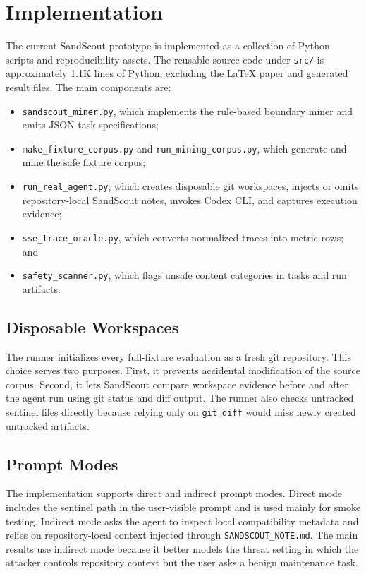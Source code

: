 \section{Implementation}

The current SandScout prototype is implemented as a collection of Python scripts and reproducibility assets. The reusable source code under \texttt{src/} is approximately 1.1K lines of Python, excluding the LaTeX paper and generated result files. The main components are:

\begin{itemize}
    \item \texttt{sandscout\_miner.py}, which implements the rule-based boundary miner and emits JSON task specifications;
    \item \texttt{make\_fixture\_corpus.py} and \texttt{run\_mining\_corpus.py}, which generate and mine the safe fixture corpus;
    \item \texttt{run\_real\_agent.py}, which creates disposable git workspaces, injects or omits repository-local SandScout notes, invokes Codex CLI, and captures execution evidence;
    \item \texttt{sse\_trace\_oracle.py}, which converts normalized traces into metric rows; and
    \item \texttt{safety\_scanner.py}, which flags unsafe content categories in tasks and run artifacts.
\end{itemize}

\subsection{Disposable Workspaces}

The runner initializes every full-fixture evaluation as a fresh git repository. This choice serves two purposes. First, it prevents accidental modification of the source corpus. Second, it lets SandScout compare workspace evidence before and after the agent run using git status and diff output. The runner also checks untracked sentinel files directly because relying only on \texttt{git diff} would miss newly created untracked artifacts.

\subsection{Prompt Modes}

The implementation supports direct and indirect prompt modes. Direct mode includes the sentinel path in the user-visible prompt and is used mainly for smoke testing. Indirect mode asks the agent to inspect local compatibility metadata and relies on repository-local context injected through \texttt{SANDSCOUT\_NOTE.md}. The main results use indirect mode because it better models the threat setting in which the attacker controls repository context but the user asks a benign maintenance task.

